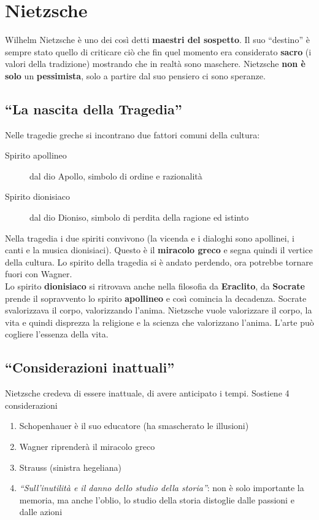 
\section{Nietzsche}
Wilhelm Nietzsche è uno dei così detti \textbf{maestri del sospetto}. Il suo ``destino'' è sempre 
stato quello di criticare ciò che fin quel momento era considerato \textbf{sacro} (i valori della
tradizione) mostrando che in realtà sono maschere. Nietzsche \textbf{non è solo} un 
\textbf{pessimista}, solo a partire dal suo pensiero ci sono speranze.

\subsection{``La nascita della Tragedia''}
Nelle tragedie greche si incontrano due fattori comuni della cultura:
\begin{description}
  \item[Spirito apollineo] dal dio Apollo, simbolo di ordine e razionalità
  \item[Spirito dionisiaco] dal dio Dioniso, simbolo di perdita della ragione ed istinto
\end{description}
Nella tragedia i due spiriti convivono (la vicenda e i dialoghi sono apollinei, i canti e la musica
dionisiaci). Questo è il \textbf{miracolo greco} e segna quindi il vertice della cultura. Lo spirito
della tragedia si è andato perdendo, ora potrebbe tornare fuori con Wagner.\\ [\baselineskip]
Lo spirito \textbf{dionisiaco} si ritrovava anche nella filosofia da \textbf{Eraclito}, da 
\textbf{Socrate} prende il sopravvento lo spirito \textbf{apollineo} e così comincia la decadenza.
Socrate svalorizzava il corpo, valorizzando l'anima. Nietzsche vuole valorizzare il corpo, la vita
e quindi disprezza la religione e la scienza che valorizzano l'anima. L'arte può cogliere l'essenza 
della vita.

\subsection{``Considerazioni inattuali''}
Nietzsche credeva di essere inattuale, di avere anticipato i tempi. Sostiene 4 considerazioni
\begin{enumerate}
  \item Schopenhauer è il suo educatore (ha smascherato le illusioni)
  \item Wagner riprenderà il miracolo greco
  \item Strauss (sinistra hegeliana)
  \item \textit{``Sull'inutilità e il danno dello studio della storia''}: non è solo importante la
    memoria, ma anche l'oblio, lo studio della storia distoglie dalle passioni e dalle azioni
\end{enumerate}

